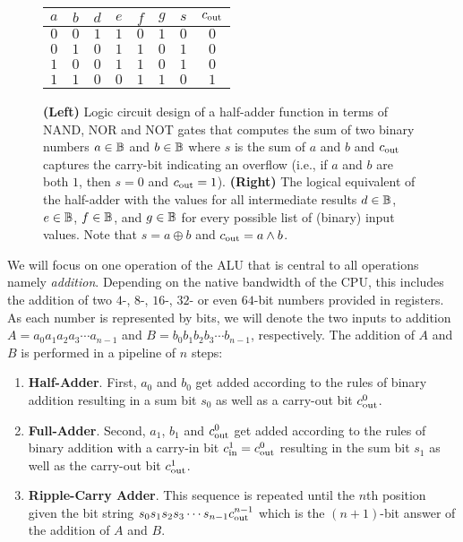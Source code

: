 \begin{figure}
\begin{minipage}[c]{.65\linewidth}
    \end{minipage}
    \hfill
    \begin{minipage}[c]{.34\linewidth}
        \centering
        \begin{tabular}{c|c||c|c|c|c|c|c}
            $a$ & $b$ & $d$ & $e$ & $f$ & $g$ & $s$ & $c_{\mathrm{out}}$ \\
            \hline
            $0$ & $0$ & $1$ & $1$ & $0$ & $1$ & $0$ & $0$     \\
            $0$ & $1$ & $0$ & $1$ & $1$ & $0$ & $1$ & $0$     \\
            $1$ & $0$ & $0$ & $1$ & $1$ & $0$ & $1$ & $0$     \\
            $1$ & $1$ & $0$ & $0$ & $1$ & $1$ & $0$ & $1$     \\
        \end{tabular}
    \end{minipage}
    \caption{{\bf (Left)} Logic circuit design of a half-adder function in terms of NAND, NOR and NOT gates that computes the sum of two binary numbers $a \in \mathbb{B}$ and $b \in \mathbb{B}$ where $s$ is the sum of $a$ and $b$ and $c_{\mathrm{out}}$ captures the carry-bit indicating an overflow (i.e., if $a$ and $b$ are both $1$, then $s=0$ and $c_{\mathrm{out}}=1$). {\bf (Right)} The logical equivalent of the half-adder with the values for all intermediate results $d \in \mathbb{B}$, $e \in \mathbb{B}$, $f \in \mathbb{B}$, and $g \in \mathbb{B}$ for every possible list of (binary) input values. Note that $s = a \oplus b$ and $c_{\mathrm{out}} = a \land b$. \label{fig:half-adder}}
\end{figure}

We will focus on one operation of the ALU that is central to all operations namely {\em addition}. Depending on the native bandwidth of the CPU, this includes the addition of two $4$-, $8$-, $16$-, $32$- or even $64$-bit numbers provided in registers. As each number is represented by bits, we will denote the two inputs to addition $A=a_0a_1a_2a_3\cdots a_{n-1}$ and $B=b_0b_1b_2b_3\cdots b_{n-1}$, respectively. The addition of $A$ and $B$ is performed in a pipeline of $n$ steps:
\begin{enumerate}
    \item {\bf Half-Adder}. First, $a_0$ and $b_0$ get added according to the rules of binary addition resulting in a sum bit $s_0$ as well as a carry-out bit $c_{\mathrm{out}}^0$.
    \item {\bf Full-Adder}. Second, $a_1$, $b_1$ and $c_{\mathrm{out}}^0$ get added according to the rules of binary addition with a carry-in bit $c_{\mathrm{in}}^1=c_{\mathrm{out}}^0$ resulting in the sum bit $s_1$ as well as the carry-out bit $c_{\mathrm{out}}^1$.
    \item {\bf Ripple-Carry Adder}. This sequence is repeated until the $n$th position given the bit string $s_0s_1s_2s_3\cdots s_{n-1}c_{\mathrm{out}}^{n-1}$ which is the $(n+1)$-bit answer of the addition of $A$ and $B$.
\end{enumerate}


